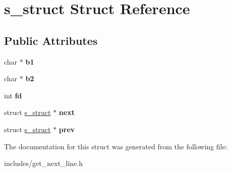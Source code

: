 \hypertarget{structs__struct}{}\section{s\+\_\+struct Struct Reference}
\label{structs__struct}
\subsection*{Public Attributes}
\begin{DoxyCompactItemize}
\item 
\mbox{\label{structs__struct_a9b8a4ab2dd3e61fc42d9fb76e77018d5}} 
char $\ast$ {\bfseries b1}
\item 
\mbox{\label{structs__struct_a34805253ecbc8b1f9730f7199ce01656}} 
char $\ast$ {\bfseries b2}
\item 
\mbox{\label{structs__struct_ada71026c4589a72c3a792567877dd410}} 
int {\bfseries fd}
\item 
\mbox{\label{structs__struct_a6ef321107d1c269dd5739ea3a1ad117e}} 
struct \hyperlink{structs__struct}{s\+\_\+struct} $\ast$ {\bfseries next}
\item 
\mbox{\label{structs__struct_a2cab8b949686991eaeb7aee1c9374cce}} 
struct \hyperlink{structs__struct}{s\+\_\+struct} $\ast$ {\bfseries prev}
\end{DoxyCompactItemize}


The documentation for this struct was generated from the following file\+:\begin{DoxyCompactItemize}
\item 
includes/get\+\_\+next\+\_\+line.\+h\end{DoxyCompactItemize}
